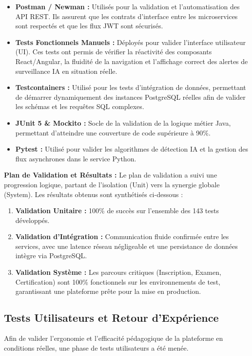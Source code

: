 \begin{itemize}
    \item \textbf{Postman / Newman :} Utilisés pour la validation et l'automatisation des API REST. Ils assurent que les contrats d'interface entre les microservices sont respectés et que les flux JWT sont sécurisés.
    \item \textbf{Tests Fonctionnels Manuels :} Déployés pour valider l'interface utilisateur (UI). Ces tests ont permis de vérifier la réactivité des composants React/Angular, la fluidité de la navigation et l'affichage correct des alertes de surveillance IA en situation réelle.
    \item \textbf{Testcontainers :} Utilisé pour les tests d'intégration de données, permettant de démarrer dynamiquement des instances PostgreSQL réelles afin de valider les schémas et les requêtes SQL complexes.
    \item \textbf{JUnit 5 \& Mockito :} Socle de la validation de la logique métier Java, permettant d'atteindre une couverture de code supérieure à 90\%.
    \item \textbf{Pytest :} Utilisé pour valider les algorithmes de détection IA et la gestion des flux asynchrones dans le service Python.
\end{itemize}

\textbf{Plan de Validation et Résultats :}
Le plan de validation a suivi une progression logique, partant de l'isolation (Unit) vers la synergie globale (System). Les résultats obtenus sont synthétisés ci-dessous :
\begin{enumerate}
    \item \textbf{Validation Unitaire :} 100\% de succès sur l'ensemble des 143 tests développés.
    \item \textbf{Validation d'Intégration :} Communication fluide confirmée entre les services, avec une latence réseau négligeable et une persistance de données intègre via PostgreSQL.
    \item \textbf{Validation Système :} Les parcours critiques (Inscription, Examen, Certification) sont 100\% fonctionnels sur les environnements de test, garantissant une plateforme prête pour la mise en production.
\end{enumerate}

\subsection{Tests Utilisateurs et Retour d'Expérience}
Afin de valider l'ergonomie et l'efficacité pédagogique de la plateforme en conditions réelles, une phase de tests utilisateurs a été menée.

